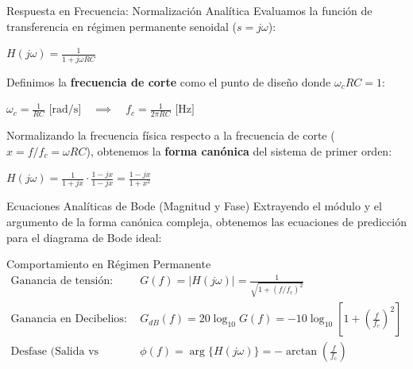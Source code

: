 \documentclass[aspectratio=169, xcolor={table,xcdraw}]{beamer}
\begin{document}
\begin{frame}{Respuesta en Frecuencia: Normalización Analítica}
    Evaluamos la función de transferencia en régimen permanente senoidal ($s = j\omega$):
    {\centering $\displaystyle H(j\omega) = \frac{1}{1 + j\omega RC}$ \par}
    \vspace{0.3cm}
    
    Definimos la \textbf{frecuencia de corte} como el punto de diseño donde $\omega_c RC = 1$:
    {\centering $\displaystyle \omega_c = \frac{1}{RC} \text{ [rad/s]} \quad \implies \quad f_c = \frac{1}{2\pi RC} \text{ [Hz]}$ \par}
    \vspace{0.3cm}
    
    Normalizando la frecuencia física respecto a la frecuencia de corte ($x = f/f_c = \omega RC$), obtenemos la \textbf{forma canónica} del sistema de primer orden:
    {\centering $\displaystyle H(j\omega) = \frac{1}{1 + jx} \cdot \frac{1 - jx}{1 - jx} = \frac{1 - jx}{1 + x^2}$ \par}
\end{frame}

\begin{frame}{Ecuaciones Analíticas de Bode (Magnitud y Fase)}
    Extrayendo el módulo y el argumento de la forma canónica compleja, obtenemos las ecuaciones de predicción para el diagrama de Bode ideal:
    
    \begin{block}{Comportamiento en Régimen Permanente}
        \begin{align*}
            \text{Ganancia de tensión:} \quad & G(f) = |H(j\omega)| = \frac{1}{\sqrt{1 + (f/f_c)^2}} \\[2ex]
            \text{Ganancia en Decibelios:} \quad & G_{dB}(f) = 20 \log_{10} G(f) = -10 \log_{10}\left[1 + \left(\frac{f}{f_c}\right)^2\right] \\[2ex]
            \text{Desfase (Salida vs Entrada):} \quad & \phi(f) = \arg\{H(j\omega)\} = -\arctan\left(\frac{f}{f_c}\right)
        \end{align*}
    \end{block}
\end{frame}
\end{document}
